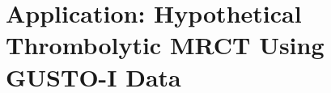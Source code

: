 \documentclass[AMA,Times1COL]{WileyNJDv5}
\begin{document}




\section{Application: Hypothetical Thrombolytic MRCT Using GUSTO-I Data}\label{sec:application}
\end{document}
